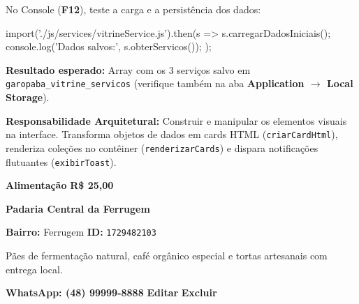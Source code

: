 \vspace{-0.25cm}
\begin{boxTeste}
No Console (\textbf{F12}), teste a carga e a persistência dos dados:
\begin{boxCodigoJS}
import('./js/services/vitrineService.js').then(s => {
  s.carregarDadosIniciais();
  console.log('Dados salvos:', s.obterServicos());
});
\end{boxCodigoJS}
\textbf{Resultado esperado:} Array com os 3 serviços salvo em \texttt{garopaba\_vitrine\_servicos} (verifique também na aba \textbf{Application $\rightarrow$ Local Storage}).
\end{boxTeste}

\clearpage
\begin{boxAtividade}
\textbf{Responsabilidade Arquitetural:} Construir e manipular os elementos visuais na interface. Transforma objetos de dados em cards HTML (\texttt{criarCardHtml}), renderiza coleções no contêiner (\texttt{renderizarCards}) e dispara notificações flutuantes (\texttt{exibirToast}).
\end{boxAtividade}

\vspace{-0.3cm}
\begin{center}
\vspace{-0.2cm}
\begin{tcolorbox}[enhanced, width=0.88\linewidth, colback=white, colframe=gray!30, arc=5pt, boxrule=0.8pt, shadow={1.5mm}{-1.5mm}{0mm}{black!12}, top=3pt, bottom=3pt, left=10pt, right=10pt]
  \colorbox{blue!12}{\color{blue!80!black}\footnotesize\bfseries Alimentação}
  \hfill
  {\large\bfseries\color{ifscGreen} R\$ 25,00}
  
  \vspace{1pt}
  {\large\bfseries Padaria Central da Ferrugem}
  
  \vspace{1pt}
  {\footnotesize\color{gray!80} \textbf{Bairro:} Ferrugem \quad \textbar \quad \textbf{ID:} \texttt{1729482103}}
  
  \vspace{1pt}
  {\small\color{gray!90} Pães de fermentação natural, café orgânico especial e tortas artesanais com entrega local.}
  
  \par\vspace{2pt}\textcolor{gray!25}{\hrulefill}\vspace{2pt}
  \colorbox{ifscGreen}{\color{white}\footnotesize\bfseries WhatsApp: (48) 99999-8888}
  \hfill
  \colorbox{orange!15}{\color{orange!85!black}\footnotesize\bfseries Editar}
  \hspace{3pt}
  \colorbox{red!15}{\color{red!80!black}\footnotesize\bfseries Excluir}
\end{tcolorbox}
\vspace{-0.2cm}
\end{center}
\vspace{-0.35cm}


